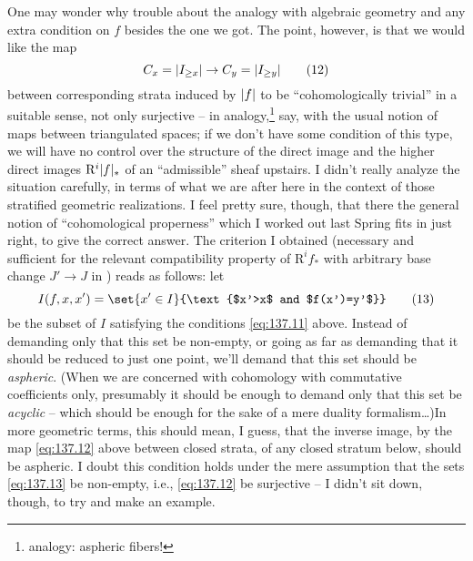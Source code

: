 One may wonder why trouble about the analogy with algebraic geometry
and any extra condition on $f$ besides the one we got. The point,
however, is that we would like the map
\begin{equation}
  \label{eq:137.12}
  C_x=\lvert I_{\ge x}\rvert \to C_y=\lvert I_{\ge y}\rvert\tag{12}
\end{equation}
between corresponding strata induced by $\lvert f\rvert$ to be
``cohomologically trivial'' in a suitable sense, not only surjective
-- in analogy,\footnote{analogy: aspheric fibers! } say, with the usual notion of maps between
triangulated spaces; if we don't have some condition of this type, we
will have no control over the structure of the direct image and the
higher direct images $\mathrm R^i\lvert f\rvert_*$ of an ``admissible'' sheaf
upstairs. I didn't really analyze the situation carefully, in terms of
what we are after here in the context of those stratified geometric
realizations. I feel pretty sure, though, that there the general
notion of ``cohomological properness'' which I worked out last Spring
fits in just right, to give the correct answer. The criterion I
obtained (necessary and sufficient for the relevant compatibility
property of $\mathrm R^if_*$ with arbitrary base change $J'\to J$ in
\Cat) reads as follows: let
\begin{equation}
  \label{eq:137.13}
  I(f,x,x') =\set{x'\in I}{\text{$x'>x$ and $f(x')=y'$}}\tag{13}
\end{equation}
be the subset of $I$ satisfying the conditions \eqref{eq:137.11}
above. Instead of demanding only that this set be non-empty, or going
as far as demanding that it should be reduced to just one point, we'll
demand that this set should be \emph{aspheric}. (When we are concerned
with cohomology with commutative coefficients only, presumably it
should be enough to demand only that this set be \emph{acyclic} --
which should be enough for the sake of a mere duality
formalism\dots)\enspace In more geometric terms, this should mean, I
guess, that the inverse image, by the map \eqref{eq:137.12} above
between closed strata, of any closed stratum below, should be
aspheric. I doubt this condition holds under the mere assumption that
the sets \eqref{eq:137.13} be non-empty, i.e., \eqref{eq:137.12} be
surjective -- I didn't sit down, though, to try and make an example.


